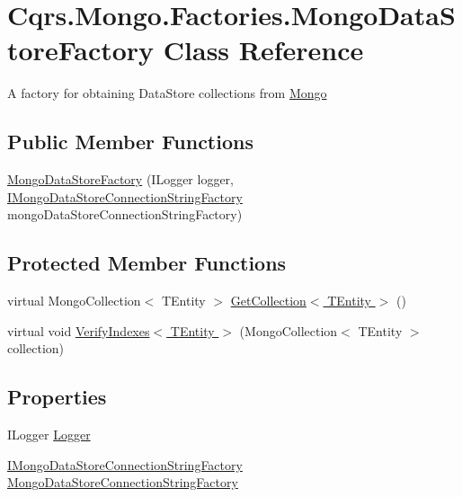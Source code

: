 \hypertarget{classCqrs_1_1Mongo_1_1Factories_1_1MongoDataStoreFactory}{}\section{Cqrs.\+Mongo.\+Factories.\+Mongo\+Data\+Store\+Factory Class Reference}
\label{classCqrs_1_1Mongo_1_1Factories_1_1MongoDataStoreFactory}


A factory for obtaining Data\+Store collections from \hyperlink{namespaceCqrs_1_1Mongo}{Mongo}  


\subsection*{Public Member Functions}
\begin{DoxyCompactItemize}
\item 
\hyperlink{classCqrs_1_1Mongo_1_1Factories_1_1MongoDataStoreFactory_a13e1957d50ef5ebb18723a3628a0ae5d}{Mongo\+Data\+Store\+Factory} (I\+Logger logger, \hyperlink{interfaceCqrs_1_1Mongo_1_1Factories_1_1IMongoDataStoreConnectionStringFactory}{I\+Mongo\+Data\+Store\+Connection\+String\+Factory} mongo\+Data\+Store\+Connection\+String\+Factory)
\end{DoxyCompactItemize}
\subsection*{Protected Member Functions}
\begin{DoxyCompactItemize}
\item 
virtual Mongo\+Collection$<$ T\+Entity $>$ \hyperlink{classCqrs_1_1Mongo_1_1Factories_1_1MongoDataStoreFactory_a4785651135b3a214a855b4d1f7700836}{Get\+Collection$<$ T\+Entity $>$} ()
\item 
virtual void \hyperlink{classCqrs_1_1Mongo_1_1Factories_1_1MongoDataStoreFactory_af7db637db99701003e3d8f73a83a3485}{Verify\+Indexes$<$ T\+Entity $>$} (Mongo\+Collection$<$ T\+Entity $>$ collection)
\end{DoxyCompactItemize}
\subsection*{Properties}
\begin{DoxyCompactItemize}
\item 
I\+Logger \hyperlink{classCqrs_1_1Mongo_1_1Factories_1_1MongoDataStoreFactory_a52df9c093f6c5a5666b27833334b48dc}{Logger}
\item 
\hyperlink{interfaceCqrs_1_1Mongo_1_1Factories_1_1IMongoDataStoreConnectionStringFactory}{I\+Mongo\+Data\+Store\+Connection\+String\+Factory} \hyperlink{classCqrs_1_1Mongo_1_1Factories_1_1MongoDataStoreFactory_a2a93f0c1223ac3eaf3228307ee2849e8}{Mongo\+Data\+Store\+Connection\+String\+Factory}
\end{DoxyCompactItemize}


